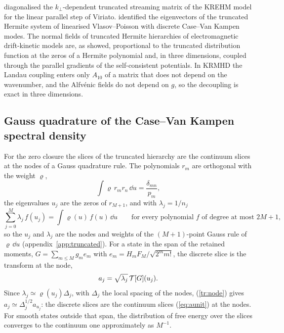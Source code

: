 \citet[\S6.2.1]{Loureiro2016} diagonalised the $k_\perp$-dependent truncated streaming matrix of the KREHM model for the linear parallel step of Viriato. \citet{ParkerDellar2015} identified the eigenvectors of the truncated Hermite system of linearised Vlasov--Poisson with discrete Case--Van Kampen modes. The normal fields of truncated Hermite hierarchies of electromagnetic drift-kinetic models \citep{Tassi2015} are, as \citet[\S7]{Tassi2022} showed, proportional to the truncated distribution function at the zeros of a Hermite polynomial and, in three dimensions, coupled through the parallel gradients of the self-consistent potentials. In KRMHD the Landau coupling enters only $A_{10}$ of a matrix that does not depend on the wavenumber, and the Alfv\'enic fields do not depend on $g$, so the decoupling is exact in three dimensions.

\subsection{Gauss quadrature of the Case--Van Kampen spectral density}\label{tr:gauss}

For the zero closure the slices of the truncated hierarchy are the continuum slices at the nodes of a Gauss quadrature rule. The polynomials $r_m$ are orthogonal with the weight $\varrho$,
\begin{equation}\label{tr:orth}
  \int\varrho\,r_mr_n\,\dd u=\frac{\delta_{mn}}{p_m},
\end{equation}
the eigenvalues $u_j$ are the zeros of $r_{M+1}$, and with $\lambda_j=1/n_j$
\begin{equation}\label{eq:gauss}
  \sum_{j=0}^M\lambda_j\,f(u_j)=\int\varrho(u)\,f(u)\,\dd u\qquad\text{for every polynomial $f$ of degree at most $2M+1$,}
\end{equation}
so the $u_j$ and $\lambda_j$ are the nodes and weights of the $(M+1)$-point Gauss rule of $\varrho\,\dd u$ (appendix~\ref{app:truncated}). For a state in the span of the retained moments, $G=\sum_{m\le M}g_me_m$ with $e_m=H_mF_M/\sqrt{2^mm!}$, the discrete slice is the transform at the node,
\begin{equation}\label{tr:node}
  a_j=\sqrt{\lambda_j}\,\mathcal T[G](u_j) .
\end{equation}
Since $\lambda_j\simeq\varrho(u_j)\Delta_j$, with $\Delta_j$ the local spacing of the nodes, (\ref{tr:node}) gives $a_j\simeq\Delta_j^{1/2}a_{u_j}$: the discrete slices are the continuum slices (\ref{eq:aunit}) at the nodes. For smooth states outside that span, the distribution of free energy over the slices converges to the continuum one approximately as $M^{-1}$.


